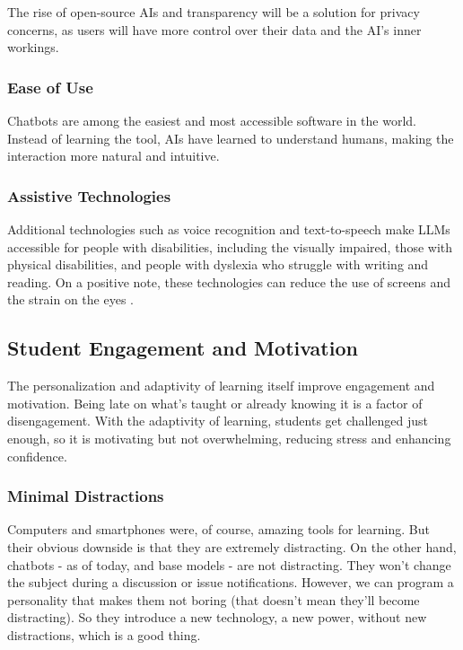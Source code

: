 \documentclass{article}
\begin{document}
The rise of open-source AIs and transparency will be a solution for privacy concerns, as users will have more control over their data and the AI's inner workings.

\subsubsection{Ease of Use}

Chatbots are among the easiest and most accessible software in the world. Instead of learning the tool, AIs have learned to understand humans, making the interaction more natural and intuitive.

\subsubsection{Assistive Technologies}

Additional technologies such as voice recognition and text-to-speech make LLMs accessible for people with disabilities, including the visually impaired, those with physical disabilities, and people with dyslexia who struggle with writing and reading. On a positive note, these technologies can reduce the use of screens and the strain on the eyes \cite{https://www.youtube.com/watch?v=L61Kbo3y218&t=607s&pp=ygUGdGVkIGFp}.

\subsection{Student Engagement and Motivation}

The personalization and adaptivity of learning itself improve engagement and motivation. Being late on what's taught or already knowing it is a factor of disengagement. With the adaptivity of learning, students get challenged just enough, so it is motivating but not overwhelming, reducing stress and enhancing confidence.

\subsubsection{Minimal Distractions}

Computers and smartphones were, of course, amazing tools for learning. But their obvious downside is that they are extremely distracting. On the other hand, chatbots - as of today, and base models - are not distracting. They won't change the subject during a discussion or issue notifications. However, we can program a personality that makes them not boring (that doesn't mean they'll become distracting). So they introduce a new technology, a new power, without new distractions, which is a good thing.
\end{document}
